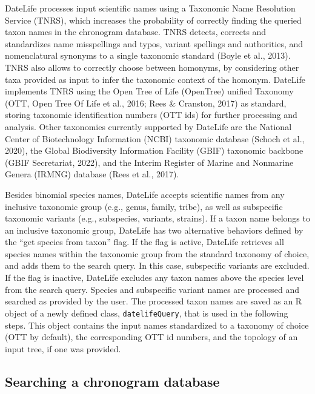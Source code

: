 \documentclass[english,man]{apa6}
\begin{document}
DateLife processes input scientific names using a Taxonomic Name Resolution Service (TNRS), which increases the probability of correctly finding the queried taxon names in the chronogram database. TNRS detects, corrects and standardizes name misspellings and typos, variant spellings and authorities, and nomenclatural synonyms to a single taxonomic standard (Boyle et al., 2013). TNRS also allows to correctly choose between homonyms, by considering other taxa provided as input to infer the taxonomic context of the homonym. DateLife implements TNRS using the Open Tree of Life (OpenTree) unified Taxonomy (OTT, Open Tree Of Life et al., 2016; Rees \& Cranston, 2017) as standard, storing taxonomic identification numbers (OTT ids) for further processing and analysis. Other taxonomies currently supported by DateLife are the National Center of Biotechnology Information (NCBI) taxonomic database (Schoch et al., 2020), the Global Biodiversity Information Facility (GBIF) taxonomic backbone (GBIF Secretariat, 2022), and the Interim Register of Marine and Nonmarine Genera (IRMNG) database (Rees et al., 2017).

Besides binomial species names, DateLife accepts scientific names from any inclusive taxonomic group (e.g., genus, family, tribe), as well as subspecific taxonomic variants (e.g., subspecies, variants, strains). If a taxon name belongs to an inclusive taxonomic group, DateLife has two alternative behaviors defined by the \enquote{get species from taxon} flag. If the flag is active, DateLife retrieves all species names within the taxonomic group from the standard taxonomy of choice, and adds them to the search query. In this case, subspecific variants are excluded.
If the flag is inactive, DateLife excludes any taxon names above the species level from the search query.
Species and subspecific variant names are processed and searched as provided by the user.
The processed taxon names are saved as an R object of a newly defined class, \texttt{datelifeQuery}, that is used in the following steps. This object contains the input names standardized to a taxonomy of choice (OTT by default), the corresponding OTT id numbers, and the topology of an input tree, if one was provided.

\hypertarget{searching-a-chronogram-database}{%
\subsection{Searching a chronogram database}\label{searching-a-chronogram-database}}
\end{document}
